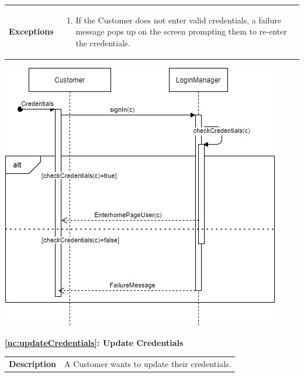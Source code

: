 \documentclass[a4paper, 12pt, oneside]{article}
\begin{document}
\begin{enumerate}[labelindent=20pt, label={UC.\arabic*}, itemindent=1em,leftmargin=!]
\begin{tabularx}{\linewidth}{| l | X |}
	\hline
	\textbf{Exceptions} & \parbox{0.7\textwidth}{ \begin{enumerate}
			\item If the Customer does not enter valid credentials, a failure message pops up on the screen prompting them to re-enter the credentials.
		\end{enumerate}}\\

	\hline
	
\end{tabularx}

\begin{minipage}{\linewidth}
            \centering
           \includegraphics[height=0.47\textheight, scale=1, keepaspectratio]{img/seq_diag/Login.jpg}
\end{minipage}

\begin{center}
{\textbf{\ref{uc:updateCredentials}: Update Credentials}}
\end{center}
\begin{tabularx}{\linewidth}{| l | X |}
	
	\hline
	\textbf{Description} & A Customer wants to update their credentials.\\
	


\end{tabularx}
\end{enumerate}
\end{document}
